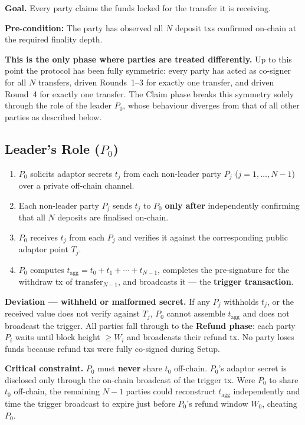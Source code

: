 \documentclass[11pt,a4paper,dvipsnames]{article}
\newcommand{\tagg}{t_{\mathrm{agg}}}
\begin{document}
\textbf{Goal.}\;
Every party claims the funds locked for the transfer it is receiving.

\textbf{Pre-condition:}
The party has observed all $N$ deposit txs confirmed on-chain at the
required finality depth.

\medskip\noindent
\textbf{This is the only phase where parties are treated differently.}
Up to this point the protocol has been fully symmetric: every party has acted
as co-signer for all $N$ transfers, driven Rounds~1--3 for exactly one
transfer, and driven Round~4 for exactly one transfer.
The Claim phase breaks this symmetry solely through the role of the leader
$P_0$, whose behaviour diverges from that of all other parties as described
below.

\subsection{Leader's Role ($P_0$)}

\begin{enumerate}
  \item $P_0$ solicits adaptor secrets $t_j$ from each non-leader party $P_j$
    ($j = 1, \ldots, N{-}1$) over a private off-chain channel.
  \item Each non-leader party $P_j$ sends $t_j$ to $P_0$ \textbf{only after}
    independently confirming that all $N$ deposits are finalised on-chain.
  \item $P_0$ receives $t_j$ from each $P_j$ and verifies it against the
    corresponding public adaptor point $T_j$.
  \item $P_0$ computes $\tagg = t_0 + t_1 + \cdots + t_{N-1}$, completes the
    pre-signature for the withdraw tx of $\mathrm{transfer}_{N-1}$, and
    broadcasts it --- the \textbf{trigger transaction}.
\end{enumerate}

\noindent\textbf{Deviation --- withheld or malformed secret.}\;
If any $P_j$ withholds $t_j$, or the received value does not verify against
$T_j$, $P_0$ cannot assemble $\tagg$ and does not broadcast the trigger.
All parties fall through to the \textbf{Refund phase}: each party $P_i$ waits
until block height $\geq W_i$ and broadcasts their refund tx.
No party loses funds because refund txs were fully co-signed during Setup.

\medskip\noindent\textbf{Critical constraint.}\;
$P_0$ must \textbf{never} share $t_0$ off-chain.
$P_0$'s adaptor secret is disclosed only through the on-chain broadcast of
the trigger tx.
Were $P_0$ to share $t_0$ off-chain, the remaining $N{-}1$ parties could
reconstruct $\tagg$ independently and time the trigger broadcast to expire
just before $P_0$'s refund window $W_0$, cheating $P_0$.
\end{document}
